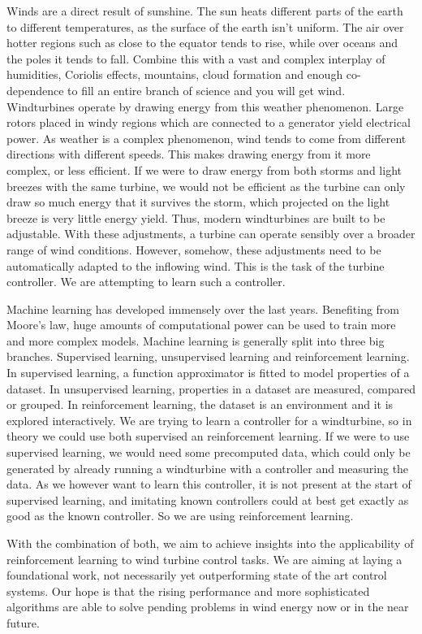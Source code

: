 \documentclass[hyperref,final,beleg]{cgvpub}
\begin{document}
Winds are a direct result of sunshine. The sun heats different parts of the earth to different temperatures, as the surface of the earth isn't uniform. The air over hotter regions such as close to the equator tends to rise, while over oceans and the poles it tends to fall. Combine this with a vast and complex interplay of humidities, Coriolis effects, mountains, cloud formation and enough co-dependence to fill an entire branch of science and you will get wind. Windturbines operate by drawing energy from this weather phenomenon. Large rotors placed in windy regions which are connected to a generator yield electrical power. As weather is a complex phenomenon, wind tends to come from different directions with different speeds. This makes drawing energy from it more complex, or less efficient. If we were to draw energy from both storms and light breezes with the same turbine, we would not be efficient as the turbine can only draw so much energy that it survives the storm, which projected on the light breeze is very little energy yield. Thus, modern windturbines are built to be adjustable. With these adjustments, a turbine can operate sensibly over a broader range of wind conditions. However, somehow, these adjustments need to be automatically adapted to the inflowing wind. This is the task of the turbine controller. We are attempting to learn such a controller.

Machine learning has developed immensely over the last years. Benefiting from Moore's law, huge amounts of computational power can be used to train more and more complex models. Machine learning is generally split into three big branches. Supervised learning, unsupervised learning and reinforcement learning. In supervised learning, a function approximator is fitted to model properties of a dataset. In unsupervised learning, properties in a dataset are measured, compared or grouped. In reinforcement learning, the dataset is an environment and it is explored interactively. We are trying to learn a controller for a windturbine, so in theory we could use both supervised an reinforcement learning. If we were to use supervised learning, we would need some precomputed data, which could only be generated by already running a windturbine with a controller and measuring the data. As we however want to learn this controller, it is not present at the start of supervised learning, and imitating known controllers could at best get exactly as good as the known controller. So we are using reinforcement learning.

With the combination of both, we aim to achieve insights into the applicability of reinforcement learning to wind turbine control tasks. We are aiming at laying a foundational work, not necessarily yet outperforming state of the art control systems. Our hope is that the rising performance and more sophisticated algorithms are able to solve pending problems in wind energy now or in the near future.
\end{document}
